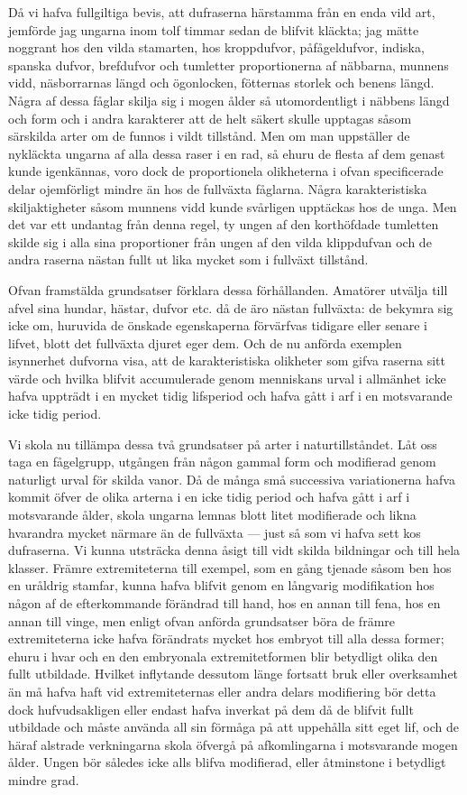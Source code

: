 Då vi hafva fullgiltiga bevis, att dufraserna härstamma från en enda vild art, jemförde jag ungarna inom tolf timmar sedan de blifvit kläckta; jag mätte noggrant hos den vilda stamarten, hos kroppdufvor, påfågeldufvor, indiska, spanska dufvor, brefdufvor och tumletter proportionerna af näbbarna, munnens vidd, näsborrarnas längd och ögonlocken, fötternas storlek och benens längd. Några af dessa fåglar skilja sig i mogen ålder så utomordentligt i näbbens längd och form och i andra karakterer att de helt säkert skulle upptagas såsom särskilda arter om de funnos i vildt tillstånd. Men om man uppställer de nykläckta ungarna af alla dessa raser i en rad, så ehuru de flesta af dem genast kunde igenkännas, voro dock de proportionela olikheterna i ofvan specificerade delar ojemförligt mindre än hos de fullväxta fåglarna. Några karakteristiska skiljaktigheter såsom munnens vidd kunde svårligen upptäckas hos de unga. Men det var ett undantag från denna regel, ty ungen af den korthöfdade tumletten skilde sig i alla sina proportioner från ungen af den vilda klippdufvan och de andra raserna nästan fullt ut lika mycket som i fullväxt tillstånd.

Ofvan framstälda grundsatser förklara dessa förhållanden. Amatörer utvälja till afvel sina hundar, hästar, dufvor etc. då de äro nästan fullväxta: de bekymra sig icke om, huruvida de önskade egenskaperna förvärfvas tidigare eller senare i lifvet, blott det fullväxta djuret eger dem. Och de nu anförda exemplen isynnerhet dufvorna visa, att de karakteristiska olikheter som gifva raserna sitt värde och hvilka blifvit accumulerade genom menniskans urval i allmänhet icke hafva uppträdt i en mycket tidig lifsperiod och hafva gått i arf i en motsvarande icke tidig period.

Vi skola nu tillämpa dessa två grundsatser på arter i naturtillståndet. Låt oss taga en fågelgrupp, utgången från någon gammal form och modifierad genom naturligt urval för skilda vanor. Då de många små successiva variationerna hafva kommit öfver de olika arterna i en icke tidig period och hafva gått i arf i motsvarande ålder, skola ungarna lemnas blott litet modifierade och likna hvarandra mycket närmare än de fullväxta — just så som vi hafva sett kos dufraserna. Vi kunna utsträcka denna åsigt till vidt skilda bildningar och till hela klasser. Främre extremiteterna till exempel, som en gång tjenade såsom ben hos en uråldrig stamfar, kunna hafva blifvit genom en långvarig modifikation hos någon af de efterkommande förändrad till hand, hos en annan till fena, hos en annan till vinge, men enligt ofvan anförda grundsatser böra de främre extremiteterna icke hafva förändrats mycket hos embryot till alla dessa former; ehuru i hvar och en den embryonala extremitetformen blir betydligt olika den fullt utbildade. Hvilket inflytande dessutom länge fortsatt bruk eller overksamhet än må hafva haft vid extremiteternas eller andra delars modifiering bör detta dock hufvudsakligen eller endast hafva inverkat på dem då de blifvit fullt utbildade och måste använda all sin förmåga på att uppehålla sitt eget lif, och de häraf alstrade verkningarna skola öfvergå på afkomlingarna i motsvarande mogen ålder. Ungen bör således icke alls blifva modifierad, eller åtminstone i betydligt mindre grad.

